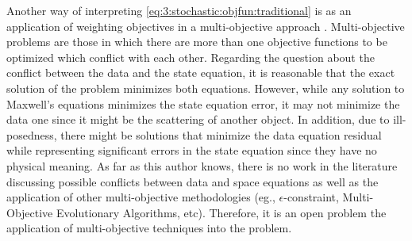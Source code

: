 			Another way of interpreting \eqref{eq:3:stochastic:objfun:traditional} is as an application of weighting objectives in a multi-objective approach \citep{chankong2008multiobjective}. Multi-objective problems are those in which there are more than one objective functions to be optimized which conflict with each other. Regarding the question about the conflict between the data and the state equation, it is reasonable that the exact solution of the problem minimizes both equations. However, while any solution to Maxwell's equations minimizes the state equation error, it may not minimize the data one since it might be the scattering of another object. In addition, due to ill-posedness, there might be solutions that minimize the data equation residual while representing significant errors in the state equation since they have no physical meaning. As far as this author knows, there is no work in the literature discussing possible conflicts between data and space equations as well as the application of other multi-objective methodologies (eg., $\epsilon$-constraint, Multi-Objective Evolutionary Algorithms, etc). Therefore, it is an open problem the application of multi-objective techniques into the problem.
			
